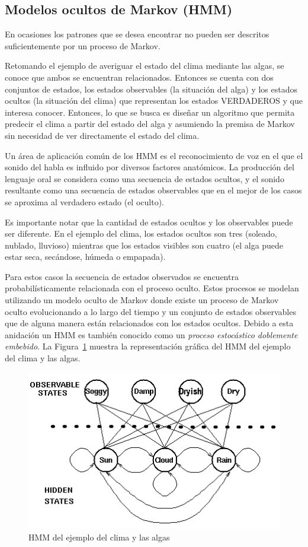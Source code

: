 \documentclass{article}
\begin{document}
\subsection{Modelos ocultos de Markov (HMM)}
\label{sub:modelos_ocultos_de_markov}
En ocasiones los patrones que se desea encontrar no pueden ser descritos suficientemente por un proceso de Markov.

Retomando el ejemplo de averiguar el estado del clima mediante las algas, se conoce que ambos se encuentran relacionados.
Entonces se cuenta con dos conjuntos de estados, los estados observables (la situación del alga) y los estados ocultos (la situación del clima) que representan los estados VERDADEROS y que interesa conocer.
Entonces, lo que se busca es diseñar un algoritmo que permita predecir el clima a partir del estado del alga y asumiendo la premisa de Markov sin necesidad de ver directamente el estado del clima.

Un área de aplicación común de los HMM es el reconocimiento de voz en el que el sonido del habla es influido por diversos factores anatómicos.
La producción del lenguaje oral se considera como una secuencia de estados ocultos, y el sonido resultante como una secuencia de estados observables que en el mejor de los casos se aproxima al verdadero estado (el oculto).

Es importante notar que la cantidad de estados ocultos y los observables puede ser diferente.
En el ejemplo del clima, los estados ocultos son tres (soleado, nublado, lluvioso) mientras que los estados visibles son cuatro (el alga puede estar seca, secándose, húmeda o empapada).

Para estos casos la secuencia de estados observados se encuentra probabilísticamente relacionada con el proceso oculto.
Estos procesos se modelan utilizando un modelo oculto de Markov donde existe un proceso de Markov oculto evolucionando a lo largo del tiempo y un conjunto de estados observables que de alguna manera están relacionados con los estados ocultos.
Debido a esta anidación un HMM es también conocido como un \emph{proceso estocástico doblemente embebido}.
La Figura~\ref{fig:hmm-clima} muestra la representación gráfica del HMM del ejemplo del clima y las algas.

\begin{figure}[tb]
	\centering
	\includegraphics[scale=0.6]{resources/images/hidden-weather-example}
	\caption{HMM del ejemplo del clima y las algas}
	\label{fig:hmm-clima}
\end{figure}
\end{document}
